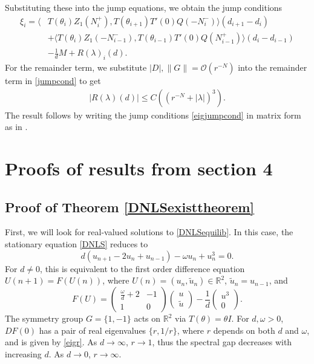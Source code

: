 \documentclass[12pt]{elsarticle}
\def\R{{\mathbb R}}
\begin{document}
Substituting these into the jump equations, we obtain the jump conditions
\begin{equation}\label{eigjumpcond}
\begin{aligned}
\xi_i = \langle &T(\theta_i) Z_1(N_i^+), T(\theta_{i+1}) T'(0)Q(-N_i^-) \rangle (d_{i+1} - d_i) \\
&+ \langle T(\theta_i) Z_1(-N_{i-1}^-), T(\theta_{i-1}) T'(0)Q(N_{i-1}^+) \rangle (d_i - d_{i-1}) \\
&-\frac{1}{d} M + R(\lambda)_i(d).
\end{aligned}
\end{equation}
For the remainder term, we substitute $|D|, \|G\| = \mathcal{O}(r^{-N})$ into the remainder term in \cref{jumpcond} to get
\begin{align*}
|R(\lambda)(d)| \leq C\left( (r^{-N} + |\lambda|)^3 \right).
\end{align*} 
The result follows by writing the jump conditions \eqref{eigjumpcond} in matrix form as in \cite{Sandstede1998}.

\section{Proofs of results from section 4}

\subsection{Proof of Theorem \ref{DNLSexisttheorem}}

First, we will look for real-valued solutions to \cref{DNLSequilib}. In this case, the stationary equation \cref{DNLS} reduces to
\begin{equation*}
d(u_{n+1} - 2 u_n + u_{n-1}) - \omega u_n + u_n^3 = 0.
\end{equation*}
For $d \neq 0$, this is equivalent to the first order difference equation $U(n+1) = F(U(n))$, where $U(n) = (u_n, \tilde{u}_n) \in \R^2$, $\tilde{u}_n = u_{n-1}$, and 
\begin{equation}\label{dnlsdiffR2}
F(U) = 
\begin{pmatrix}
\frac{\omega}{d} + 2 & -1 \\
1 & 0
\end{pmatrix}
\begin{pmatrix}
u \\ \tilde{u}
\end{pmatrix}
- \frac{1}{d} 
\begin{pmatrix}
u^3 \\ 0
\end{pmatrix}.
\end{equation}
The symmetry group $G = \{ 1, -1\}$ acts on $\R^2$ via $T(\theta) = \theta I$. For $d, \omega > 0$, $DF(0)$ has a pair of real eigenvalues $\{r, 1/r \}$, where $r$ depends on both $d$ and $\omega$, and is given by \cref{eigr}. As $d \rightarrow \infty$, $r \rightarrow 1$, thus the spectral gap decreases with increasing $d$. As $d \rightarrow 0$, $r \rightarrow \infty$.
\end{document}
